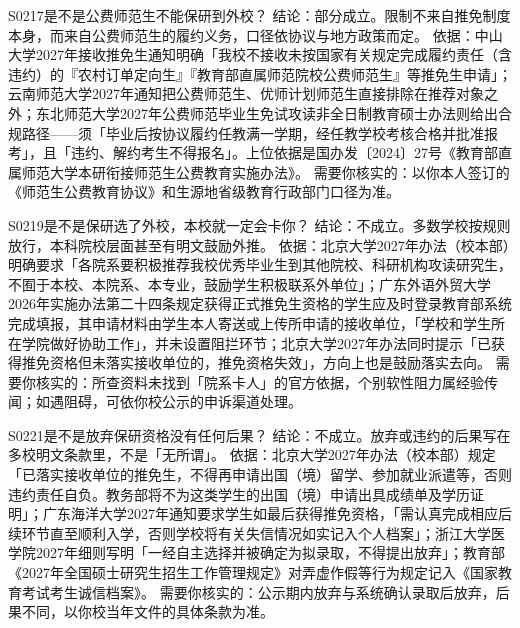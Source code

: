 \begin{qa}{S0217}{是不是公费师范生不能保研到外校？}
结论：部分成立。限制不来自推免制度本身，而来自公费师范生的履约义务，口径依协议与地方政策而定。
依据：中山大学2027年接收推免生通知明确「我校不接收未按国家有关规定完成履约责任（含违约）的『农村订单定向生』『教育部直属师范院校公费师范生』等推免生申请」；云南师范大学2027年通知把公费师范生、优师计划师范生直接排除在推荐对象之外；东北师范大学2027年公费师范毕业生免试攻读非全日制教育硕士办法则给出合规路径——须「毕业后按协议履约任教满一学期，经任教学校考核合格并批准报考」，且「违约、解约考生不得报名」。上位依据是国办发〔2024〕27号《教育部直属师范大学本研衔接师范生公费教育实施办法》。
需要你核实的：以你本人签订的《师范生公费教育协议》和生源地省级教育行政部门口径为准。
\end{qa}

\begin{qa}{S0219}{是不是保研选了外校，本校就一定会卡你？}
结论：不成立。多数学校按规则放行，本科院校层面甚至有明文鼓励外推。
依据：北京大学2027年办法（校本部）明确要求「各院系要积极推荐我校优秀毕业生到其他院校、科研机构攻读研究生，不囿于本校、本院系、本专业，鼓励学生积极联系外单位」；广东外语外贸大学2026年实施办法第二十四条规定获得正式推免生资格的学生应及时登录教育部系统完成填报，其申请材料由学生本人寄送或上传所申请的接收单位，「学校和学生所在学院做好协助工作」，并未设置阻拦环节；北京大学2027年办法同时提示「已获得推免资格但未落实接收单位的，推免资格失效」，方向上也是鼓励落实去向。
需要你核实的：所查资料未找到「院系卡人」的官方依据，个别软性阻力属经验传闻；如遇阻碍，可依你校公示的申诉渠道处理。
\end{qa}

\begin{qa}{S0221}{是不是放弃保研资格没有任何后果？}
结论：不成立。放弃或违约的后果写在多校明文条款里，不是「无所谓」。
依据：北京大学2027年办法（校本部）规定「已落实接收单位的推免生，不得再申请出国（境）留学、参加就业派遣等，否则违约责任自负。教务部将不为这类学生的出国（境）申请出具成绩单及学历证明」；广东海洋大学2027年通知要求学生如最后获得推免资格，「需认真完成相应后续环节直至顺利入学，否则学校将有关失信情况如实记入个人档案」；浙江大学医学院2027年细则写明「一经自主选择并被确定为拟录取，不得提出放弃」；教育部《2027年全国硕士研究生招生工作管理规定》对弄虚作假等行为规定记入《国家教育考试考生诚信档案》。
需要你核实的：公示期内放弃与系统确认录取后放弃，后果不同，以你校当年文件的具体条款为准。
\end{qa}

